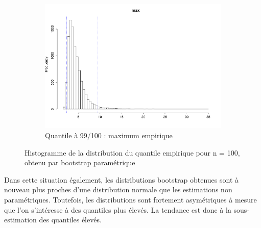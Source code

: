 \documentclass{article}
\renewcommand*{\(}{ \left( }
\renewcommand*{\)}{ \right) }
\begin{document}
\begin{figure}[H]
\begin{subfigure}[t]{0.3\textwidth}
        \includegraphics[width = \linewidth]{img/BootstrapParamEMV-Max-100.pdf}
        \caption{Quantile à 99/100 : maximum empirique}
        \label{fig:BPEMVMaxb}
    \end{subfigure}%
    \caption{Histogramme de la distribution du quantile empirique pour n = 100, obtenu par bootstrap paramétrique}
    \label{fig:BPEMVb}
\end{figure}

Dans cette situation également, les distributions bootstrap obtenues sont à nouveau plus proches d'une distribution normale que les estimations non paramétriques. Toutefois, les distributions sont fortement asymétriques à mesure que l'on s'intéresse à des quantiles plus élevés. La tendance est donc à la sous-estimation des quantiles élevés.
\end{document}
